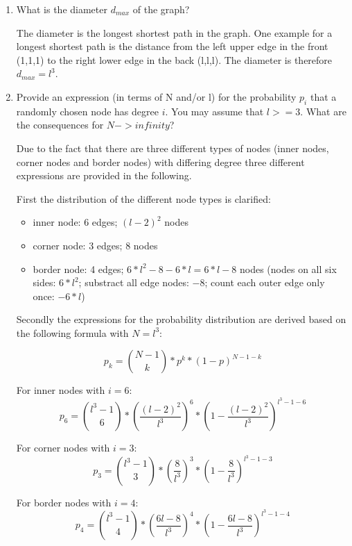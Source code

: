 \begin{enumerate}
	\item What is the diameter $d_{max}$ of the graph?
	
	The diameter is the longest shortest path in the graph. One example for a longest shortest path is the distance from the left upper edge in the front (1,1,1) to the right lower edge in the back (l,l,l). The diameter is therefore $d_{max} = l^3$.
	
	\item Provide an expression (in terms of N and/or l) for the probability $p_i$ that a randomly chosen node has degree $i$. You may assume that $l >= 3$. What are the consequences for $N -> infinity$?
	
	Due to the fact that there are three different types of nodes (inner nodes, corner nodes and border nodes) with differing degree three different expressions are provided in the following.
	
	First the distribution of the different node types is clarified:
	\begin{itemize}
		\item inner node: 6 edges; $(l-2)^2$ nodes
		\item corner node: 3 edges; $8$ nodes
		\item border node: 4 edges; $6*l^2 - 8 - 6*l = 6*l - 8$ nodes (nodes on all six sides: $6*l^2$; substract all edge nodes: $-8$; count each outer edge only once: $-6*l$)
	\end{itemize}

	Secondly the expressions for the probability distribution are derived based on the following formula with $N=l^3$:
	
	\begin{equation}
	p_k = {{N-1}\choose{k}} * p^k * (1-p)^{N-1-k}
	\end{equation}
	
	For inner nodes with $i=6$:
	\begin{equation}
	p_6 = {{l^3-1}\choose{6}} * ({\frac{(l-2)^2}{l^3}})^6 * (1-{\frac{(l-2)^2}{l^3}})^{l^3-1-6}
	\end{equation}
	
	For corner nodes with $i=3$:
	\begin{equation}
	p_3 = {{l^3-1}\choose{3}} * ({\frac{8}{l^3}})^3 * (1-{\frac{8}{l^3}})^{l^3-1-3}
	\end{equation}
	
	For border nodes with $i=4$:
	\begin{equation}
	p_4 = {{l^3-1}\choose{4}} * ({\frac{6l-8}{l^3}})^4 * (1-{\frac{6l-8}{l^3}})^{l^3-1-4}
	\end{equation}
	

\end{enumerate}
